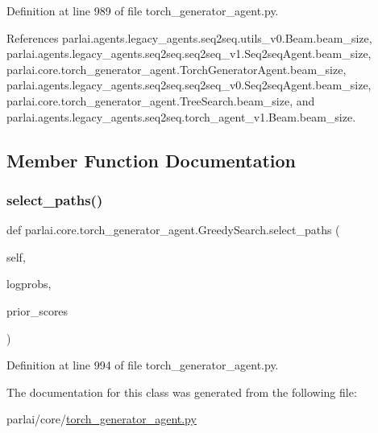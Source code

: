 Definition at line 989 of file torch\+\_\+generator\+\_\+agent.\+py.



References parlai.\+agents.\+legacy\+\_\+agents.\+seq2seq.\+utils\+\_\+v0.\+Beam.\+beam\+\_\+size, parlai.\+agents.\+legacy\+\_\+agents.\+seq2seq.\+seq2seq\+\_\+v1.\+Seq2seq\+Agent.\+beam\+\_\+size, parlai.\+core.\+torch\+\_\+generator\+\_\+agent.\+Torch\+Generator\+Agent.\+beam\+\_\+size, parlai.\+agents.\+legacy\+\_\+agents.\+seq2seq.\+seq2seq\+\_\+v0.\+Seq2seq\+Agent.\+beam\+\_\+size, parlai.\+core.\+torch\+\_\+generator\+\_\+agent.\+Tree\+Search.\+beam\+\_\+size, and parlai.\+agents.\+legacy\+\_\+agents.\+seq2seq.\+torch\+\_\+agent\+\_\+v1.\+Beam.\+beam\+\_\+size.



\subsection{Member Function Documentation}
\mbox{\label{classparlai_1_1core_1_1torch__generator__agent_1_1GreedySearch_aa201e7824f50e2830cede9adc4bffcd6}} 
\subsubsection{\texorpdfstring{select\+\_\+paths()}{select\_paths()}}
{\footnotesize\ttfamily def parlai.\+core.\+torch\+\_\+generator\+\_\+agent.\+Greedy\+Search.\+select\+\_\+paths (\begin{DoxyParamCaption}\item[{}]{self,  }\item[{}]{logprobs,  }\item[{}]{prior\+\_\+scores }\end{DoxyParamCaption})}



Definition at line 994 of file torch\+\_\+generator\+\_\+agent.\+py.



The documentation for this class was generated from the following file\+:\begin{DoxyCompactItemize}
\item 
parlai/core/\hyperlink{torch__generator__agent_8py}{torch\+\_\+generator\+\_\+agent.\+py}\end{DoxyCompactItemize}
